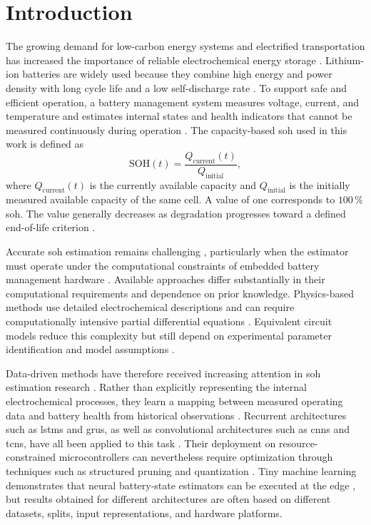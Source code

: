 \documentclass[final,3p,times]{elsarticle}
\begin{document}
\section{Introduction}
The growing demand for low-carbon energy systems and electrified transportation has increased the importance of reliable electrochemical energy storage \cite{lin_towards_2022, ngoy_lithium-ion_2025}. Lithium-ion batteries are widely used because they combine high energy and power density with long cycle life and a low self-discharge rate \cite{chen_review_2021, khan_maximizing_2023, zhang_cycle_2024}. To support safe and efficient operation, a battery management system measures voltage, current, and temperature and estimates internal states and health indicators that cannot be measured continuously during operation \cite{ali_towards_2019, noura_review_2020}. The capacity-based \ac{soh} used in this work is defined as
\begin{equation}
    \mathrm{SOH}(t) = \frac{Q_\mathrm{current}(t)}{Q_\mathrm{initial}},
\end{equation}
where $Q_\mathrm{current}(t)$ is the currently available capacity and $Q_\mathrm{initial}$ is the initially measured available capacity of the same cell. A value of one corresponds to $100\,\%$ \ac{soh}. The value generally decreases as degradation progresses toward a defined end-of-life criterion \cite{tao_data-based_2024, jin_overview_2021}.

Accurate \ac{soh} estimation remains challenging \cite{yao_fast-adaptive_2025, tran_comprehensive_2021}, particularly when the estimator must operate under the computational constraints of embedded battery management hardware \cite{hu_onet_2026}. Available approaches differ substantially in their computational requirements and dependence on prior knowledge. Physics-based methods use detailed electrochemical descriptions and can require computationally intensive partial differential equations \cite{iurilli_physics-based_2022, tu_integrating_2023}. Equivalent circuit models reduce this complexity but still depend on experimental parameter identification and model assumptions \cite{noura_review_2020, chang_improvement_2022}.

Data-driven methods have therefore received increasing attention in \ac{soh} estimation research \cite{sylvestrin_state_2025}. Rather than explicitly representing the internal electrochemical processes, they learn a mapping between measured operating data and battery health from historical observations \cite{yao_fast-adaptive_2025}. Recurrent architectures such as \acp{lstm} and \acp{gru}, as well as convolutional architectures such as \acp{cnn} and \acp{tcn}, have all been applied to this task \cite{sylvestrin_state_2025, yang_state_2024}. Their deployment on resource-constrained microcontrollers can nevertheless require optimization through techniques such as structured pruning and quantization \cite{schulze_pq_2025}. Tiny machine learning demonstrates that neural battery-state estimators can be executed at the edge \cite{pau_tiny_2024}, but results obtained for different architectures are often based on different datasets, splits, input representations, and hardware platforms.
\end{document}
